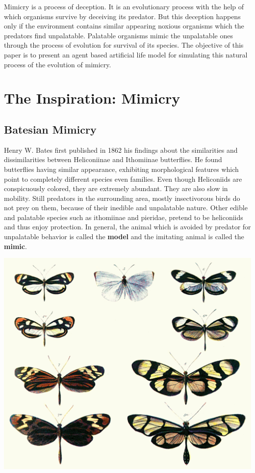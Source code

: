 \documentclass[a0,portrait]{a0poster}
\begin{document}
\begin{multicols}{2}
Mimicry is a process of deception. It is an evolutionary process with the help of which organisms survive by deceiving its predator. But this deception happens only if the environment contains similar appearing noxious organisms which the predators find unpalatable. Palatable organisms mimic the unpalatable ones through the process of evolution for survival of its species. The objective of this paper is to present an agent based artificial life model for simulating this natural process of the evolution of mimicry.

\color{DarkSlateGray} %


\section*{The Inspiration: Mimicry}
\subsection*{Batesian Mimicry}
Henry W. Bates first published in 1862 his findings about the similarities and dissimilarities between Heliconiinae and Ithomiinae butterflies. He found butterflies having similar appearance, exhibiting morphological features which point to completely different species even families. Even though Heliconiids are conspicuously colored, they are extremely abundant. They are also slow in mobility. Still predators in the surrounding area, mostly insectivorous birds do not prey on them, because of their inedible and unpalatable nature. Other edible and palatable species such as ithomiinae and pieridae, pretend to be heliconiids and thus enjoy protection. In general, the animal which is avoided by predator for unpalatable behavior is called the \textbf{model} and the imitating animal is called the \textbf{mimic}.

\begin{center}\vspace{1cm}
\includegraphics[width=0.5\linewidth]{Batesplate_ArM.jpg}
\end{center}\vspace{1cm}


\end{multicols}
\end{document}
